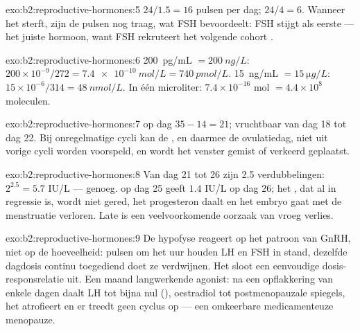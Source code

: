 \begin{solution}{exo:b2:reproductive-hormones:5}
$24/1.5 = 16$ pulsen per dag; $24/4 = 6$. Wanneer het  sterft,
zijn de pulsen nog traag, wat FSH bevoordeelt: FSH stijgt als eerste ---
het juiste hormoon, want FSH rekruteert het volgende cohort .
\end{solution}

\begin{solution}{exo:b2:reproductive-hormones:6}
\qty{200}{pg/mL} $= \qty{200}{ng/L}$: $200\times 10^{-9}/272 =
\qty{7.4e-10}{mol/L} = \qty{740}{pmol/L}$. \qty{15}{ng/mL} $=
\qty{15}{\micro g/L}$: $15\times 10^{-6}/314 = \qty{48}{nmol/L}$. In
één microliter: $7.4\times 10^{-16}$ mol $= 4.4\times 10^{8}$
moleculen.
\end{solution}

\begin{solution}{exo:b2:reproductive-hormones:7}
 op dag $35 - 14 = 21$; vruchtbaar van dag 18 tot dag 22. Bij
onregelmatige cycli kan de , en daarmee de ovulatiedag,
niet uit vorige cycli worden voorspeld, en wordt het venster gemist of
verkeerd geplaatst.
\end{solution}

\begin{solution}{exo:b2:reproductive-hormones:8}
Van dag 21 tot 26 zijn 2.5 verdubbelingen: $2^{2.5} = 5.7$ IU/L ---
genoeg.  op dag 25 geeft $1.4$ IU/L op dag 26; het , dat al in regressie is, wordt niet gered, het progesteron daalt en
het embryo gaat met de menstruatie verloren. Late  is een
veelvoorkomende oorzaak van vroeg verlies.
\end{solution}

\begin{solution}{exo:b2:reproductive-hormones:9}
De hypofyse reageert op het patroon van GnRH, niet op de hoeveelheid:
pulsen om het uur houden LH en FSH in stand, dezelfde dagdosis continu
toegediend doet ze verdwijnen. Het sloot een eenvoudige dosis-responsrelatie
uit. Een maand langwerkende agonist: na een opflakkering van enkele dagen
daalt LH tot bijna nul (), oestradiol tot
postmenopauzale spiegels, het  atrofieert en er treedt geen
cyclus op --- een omkeerbare medicamenteuze menopauze.
\end{solution}

